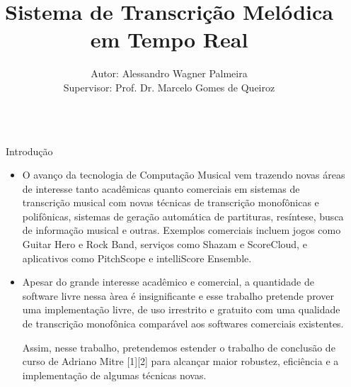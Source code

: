 \documentclass[final,hyperref={pdfpagelabels=false}]{beamer}
\title{\huge Sistema de Transcrição Melódica em Tempo Real} %
\author{Autor: Alessandro Wagner Palmeira \\ Supervisor: Prof. Dr. Marcelo Gomes de Queiroz} %
\institute{Instituto de Matemática e Estatística - Universidade de São Paulo} %
\begin{document}

\begin{frame}[t] %

\begin{columns}[t] %

\begin{column}{.02\textwidth}\end{column} %

\begin{column}{.465\textwidth} %


\begin{block}{Introdução}

\begin{itemize}
\item O avanço da tecnologia de Computação Musical vem trazendo novas áreas de interesse tanto acadêmicas quanto comerciais em sistemas de transcrição musical com novas técnicas de transcrição monofônicas e polifônicas, sistemas de geração automática de partituras, resíntese, busca de informação musical e outras. Exemplos comerciais incluem jogos como Guitar Hero e Rock Band, serviços como Shazam e ScoreCloud, e aplicativos como PitchScope e intelliScore Ensemble.

\item Apesar do grande interesse acadêmico e comercial, a quantidade de software livre nessa àrea é insignificante e esse trabalho pretende prover uma implementação livre, de uso irrestrito e gratuito com uma qualidade de transcrição monofônica comparável aos softwares comerciais existentes.

Assim, nesse trabalho, pretendemos estender o trabalho de conclusão de curso de Adriano Mitre [1][2] para alcançar maior robustez, eficiência e a implementação de algumas técnicas novas.
\end{itemize}

\end{block}


\end{column}
\end{columns}
\end{frame}
\end{document}
